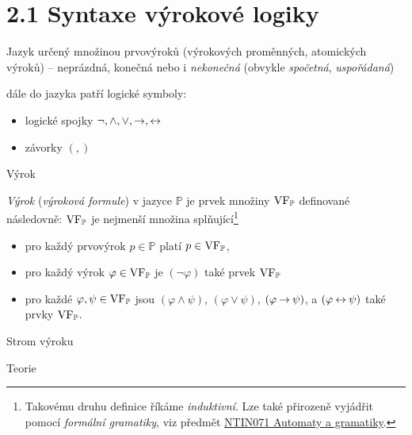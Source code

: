 \documentclass{beamer}
\begin{document}
\section{2.1 Syntaxe výrokové logiky}


\begin{frame}{Jazyk}
    určený množinou \alert{prvovýroků} (\alert{výrokových proměnných}, \alert{atomických výroků}) -- neprázdná, konečná nebo i \emph{nekonečná}
    (obvykle \emph{spočetná}, \emph{uspořádaná})

    dále do jazyka patří \alert{logické symboly}:
    \begin{itemize}
        \item logické spojky $\neg,{\land},{\lor}, {\mathbin{\rightarrow}}, {\mathbin{\leftrightarrow}}$
        \item závorky $(,)$
    \end{itemize}
\end{frame}


\begin{frame}{Výrok}
\begin{definition}[Výrok]\label{definition:proposition}
    \emph{Výrok} (\emph{výroková formule}) v jazyce $\mathbb P$ je prvek množiny $\operatorname{VF}_\mathbb P$ definované následovně: $\operatorname{VF}_\mathbb P$ je nejmenší množina splňující\footnote{Takovému druhu definice říkáme \emph{induktivní}. Lze také přirozeně vyjádřit pomocí \emph{formální gramatiky}, viz předmět \href{https://is.cuni.cz/studium/predmety/index.php?do=predmet&kod=NTIN071}{NTIN071 Automaty a gramatiky}.}
    \begin{itemize}
        \item pro každý prvovýrok $p\in\mathbb P$ platí $p\in\operatorname{VF}_\mathbb P$,
        \item pro každý výrok $\varphi\in\operatorname{VF}_\mathbb P$ je $(\neg\varphi)$ také prvek $\operatorname{VF}_\mathbb P$
        \item pro každé $\varphi,\psi\in\operatorname{VF}_\mathbb P$ jsou $(\varphi\land\psi)$, $(\varphi\lor\psi)$, $(\varphi\mathbin{\rightarrow}\psi)$, a $(\varphi\mathbin{\leftrightarrow}\psi)$ také prvky $\operatorname{VF}_\mathbb P$.
    \end{itemize}        
\end{definition}    
\end{frame}


\begin{frame}{Strom výroku}
    
\end{frame}


\begin{frame}{Teorie}
    
\end{frame}
\end{document}
